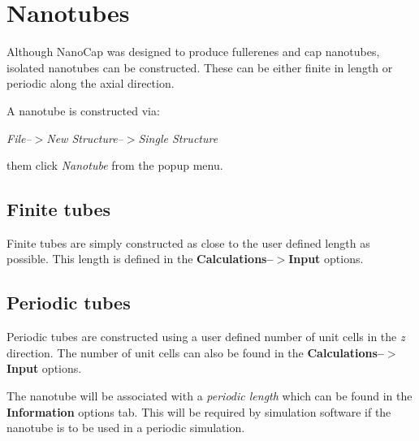 %
%
%

\section{Nanotubes}

Although NanoCap was designed to produce fullerenes and cap nanotubes, isolated nanotubes can be constructed. These can be either finite 
in length or periodic along the axial direction.

A nanotube is constructed via:

\textit{File--$>$New Structure--$>$Single Structure}

them click \textit{Nanotube} from the popup menu.

\subsection{Finite tubes}

Finite tubes are simply constructed as close to the user defined length as possible. 
This length is defined in the \textbf{Calculations--$>$Input} options.
 
\subsection{Periodic tubes}

Periodic tubes are constructed using a user defined number of unit cells in the \textit{z} direction. 
The number of unit cells can also be found in the \textbf{Calculations--$>$Input} options.

The nanotube will be associated with a \textit{periodic length} which can be found in the
\textbf{Information} options tab. This will be required by simulation software if the nanotube is to be
used in a periodic simulation.

%